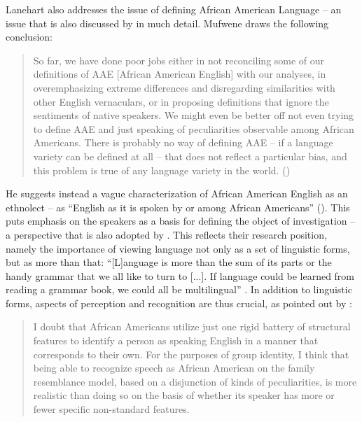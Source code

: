 Lanehart also addresses the issue of defining African American Language – an issue that is also discussed by \citet{Mufwene2001b} in much detail. Mufwene draws the following conclusion:

\begin{quote}
So far, we have done poor jobs either in not reconciling some of our definitions of AAE [African American English] with our analyses, in overemphasizing extreme differences and disregarding similarities with other English vernaculars, or in proposing definitions that ignore the sentiments of native speakers. We might even be better off not even trying to define AAE and just speaking of peculiarities observable among African Americans. There is probably no way of defining AAE – if a language variety can be defined at all – that does not reflect a particular bias, and this problem is true of any language variety in the world. (\citeyear[37]{Mufwene2001b})
\end{quote}


He suggests instead a vague characterization of African American English as an ethnolect – as “English as it is spoken by or among African Americans” (\citeyear[37]{Mufwene2001b}). This puts emphasis on the speakers as a basis for defining the object of investigation – a perspective that is also adopted by \citet{Lanehart2017}. This reflects their research position, namely the importance of viewing language not only as a set of linguistic forms, but as more than that: “[L]anguage is more than the sum of its parts or the handy grammar that we all like to turn to [...]. If language could be learned from reading a grammar book, we could all be multilingual” \citep[91]{Lanehart2017}. In addition to linguistic forms, aspects of perception and recognition are thus crucial, as pointed out by \citet[37]{Mufwene2001b}:


\begin{quote}
I doubt that African Americans utilize just one rigid battery of structural features to identify a person as speaking English in a manner that corresponds to their own. For the purposes of group identity, I think that being able to recognize speech as African American on the family resemblance model, based on a disjunction of kinds of peculiarities, is more realistic than doing so on the basis of whether its speaker has more or fewer specific non-standard features.
\end{quote}

